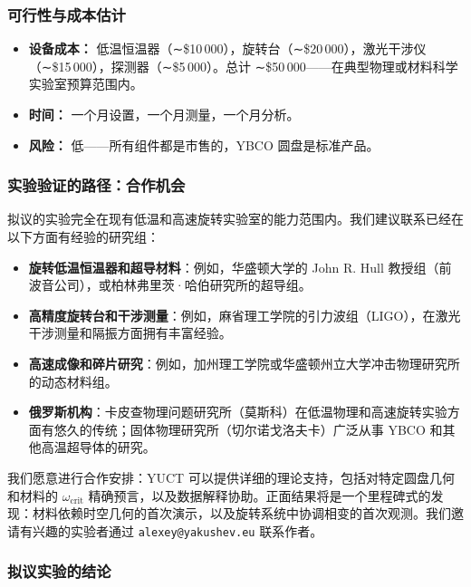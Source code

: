 \documentclass[12pt,a4paper]{article}
\begin{document}
	\subsubsection{可行性与成本估计}
	
	\begin{itemize}
		\item \textbf{设备成本：} 低温恒温器（∼\$10 000），旋转台（∼\$20 000），激光干涉仪（∼\$15 000），探测器（∼\$5 000）。总计 ∼\$50 000——在典型物理或材料科学实验室预算范围内。
		\item \textbf{时间：} 一个月设置，一个月测量，一个月分析。
		\item \textbf{风险：} 低——所有组件都是市售的，YBCO 圆盘是标准产品。
	\end{itemize}
	
	\subsubsection{实验验证的路径：合作机会}
	
	拟议的实验完全在现有低温和高速旋转实验室的能力范围内。我们建议联系已经在以下方面有经验的研究组：
	
	\begin{itemize}
		\item \textbf{旋转低温恒温器和超导材料}：例如，华盛顿大学的 John R. Hull 教授组（前波音公司），或柏林弗里茨·哈伯研究所的超导组。
		\item \textbf{高精度旋转台和干涉测量}：例如，麻省理工学院的引力波组（LIGO），在激光干涉测量和隔振方面拥有丰富经验。
		\item \textbf{高速成像和碎片研究}：例如，加州理工学院或华盛顿州立大学冲击物理研究所的动态材料组。
		\item \textbf{俄罗斯机构}：卡皮查物理问题研究所（莫斯科）在低温物理和高速旋转实验方面有悠久的传统；固体物理研究所（切尔诺戈洛夫卡）广泛从事 YBCO 和其他高温超导体的研究。
	\end{itemize}
	
	我们愿意进行合作安排：YUCT 可以提供详细的理论支持，包括对特定圆盘几何和材料的 \(\omega_{\text{crit}}\) 精确预言，以及数据解释协助。正面结果将是一个里程碑式的发现：材料依赖时空几何的首次演示，以及旋转系统中协调相变的首次观测。我们邀请有兴趣的实验者通过 \texttt{alexey@yakushev.eu} 联系作者。
	
	\subsubsection{拟议实验的结论}
	
\end{document}
